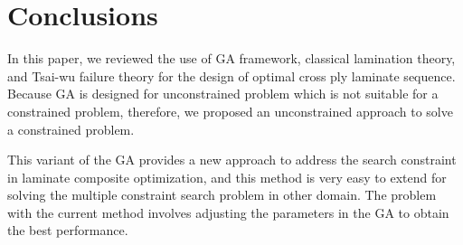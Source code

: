 \section{Conclusions}
In this paper, we reviewed the use of GA framework, classical lamination
theory, and Tsai-wu failure theory for the design of optimal cross ply laminate
sequence. Because GA is designed for unconstrained  problem which is not
suitable for a constrained problem, therefore, we proposed an unconstrained
approach to solve a constrained problem.

This variant of the GA provides a new approach to address the search constraint in laminate composite
optimization, and this method is very easy to extend for solving the multiple constraint search problem in other
domain. The problem with the current method involves adjusting the parameters in the GA to obtain the best
performance.
